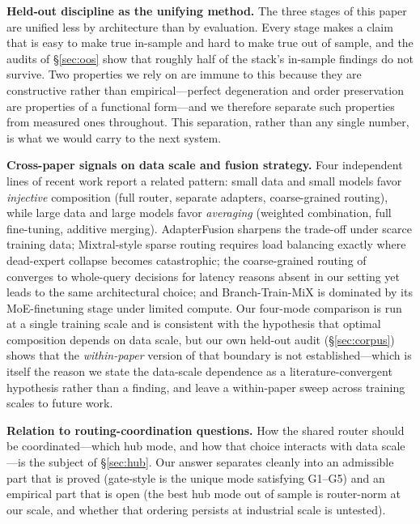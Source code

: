 \documentclass[10pt,twoside]{article}
\theoremstyle{definition}
\theoremstyle{plain}
\theoremstyle{remark}
\begin{document}
\textbf{Held-out discipline as the unifying method.} The three stages of this paper are unified less by architecture than by evaluation. Every stage makes a claim that is easy to make true in-sample and hard to make true out of sample, and the audits of \S\ref{sec:oos} show that roughly half of the stack's in-sample findings do not survive. Two properties we rely on are immune to this because they are constructive rather than empirical---perfect degeneration and order preservation are properties of a functional form---and we therefore separate such properties from measured ones throughout. This separation, rather than any single number, is what we would carry to the next system.

\textbf{Cross-paper signals on data scale and fusion strategy.} Four independent lines of recent work report a related pattern: small data and small models favor \emph{injective} composition (full router, separate adapters, coarse-grained routing), while large data and large models favor \emph{averaging} (weighted combination, full fine-tuning, additive merging). AdapterFusion \citep{pfeiffer2021} sharpens the trade-off under scarce training data; Mixtral-style sparse routing \citep{jiang2024mixtral} requires load balancing exactly where dead-expert collapse becomes catastrophic; the coarse-grained routing of \citet{liu2026orchestrating} converges to whole-query decisions for latency reasons absent in our setting yet leads to the same architectural choice; and Branch-Train-MiX \citep{sukhbaatar2024btx} is dominated by its MoE-finetuning stage under limited compute. Our four-mode comparison is run at a single training scale and is consistent with the hypothesis that optimal composition depends on data scale, but our own held-out audit (\S\ref{sec:corpus}) shows that the \emph{within-paper} version of that boundary is not established---which is itself the reason we state the data-scale dependence as a literature-convergent hypothesis rather than a finding, and leave a within-paper sweep across training scales to future work.

\textbf{Relation to routing-coordination questions.} How the shared router should be coordinated---which hub mode, and how that choice interacts with data scale---is the subject of \S\ref{sec:hub}. Our answer separates cleanly into an admissible part that is proved (gate-style is the unique mode satisfying G1--G5) and an empirical part that is open (the best hub mode out of sample is router-norm at our scale, and whether that ordering persists at industrial scale is untested).
\end{document}
